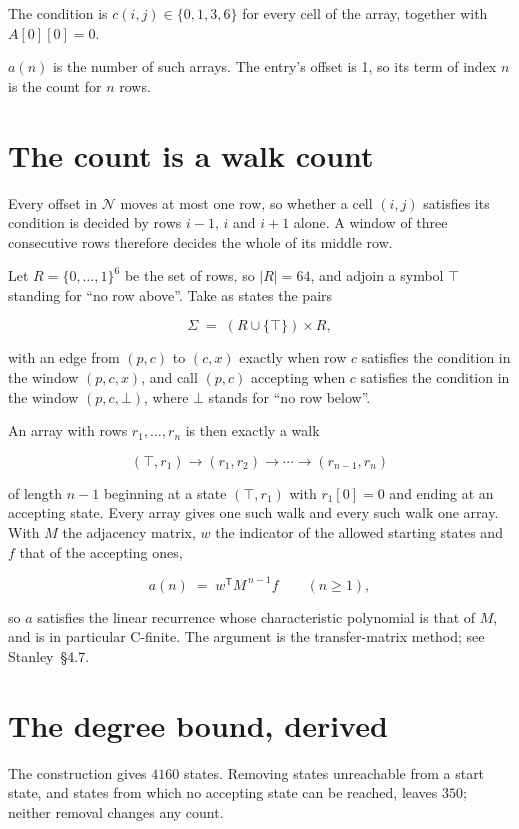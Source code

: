\documentclass[11pt]{article}
\theoremstyle{definition}
\begin{document}
The condition is $c(i,j) \in \{0, 1, 3, 6\}$ for every cell of the array, together with $A[0][0]=0$.

$a(n)$ is the number of such arrays. The entry's offset is 1, so its term of index $n$ is the count for $n$ rows.

\section{The count is a walk count}

Every offset in $\mathcal{N}$ moves at most one row, so whether a cell $(i,j)$ satisfies its condition is decided by rows $i-1$, $i$ and $i+1$ alone. A window of three consecutive rows therefore decides the whole of its middle row.

Let $R = \{0,\dots,1\}^{6}$ be the set of rows, so $|R| = 64$, and adjoin a symbol $\top$ standing for ``no row above''. Take as states the pairs

\[\Sigma \;=\; (R \cup \{\top\}) \times R,\]

with an edge from $(p,c)$ to $(c,x)$ exactly when row $c$ satisfies the condition in the window $(p,c,x)$, and call $(p,c)$ accepting when $c$ satisfies the condition in the window $(p,c,\bot)$, where $\bot$ stands for ``no row below''.

An array with rows $r_1,\dots,r_n$ is then exactly a walk

\[(\top,r_1) \to (r_1,r_2) \to \cdots \to (r_{n-1},r_n)\]

of length $n-1$ beginning at a state $(\top,r_1)$ with $r_1[0]=0$ and ending at an accepting state. Every array gives one such walk and every such walk one array. With $M$ the adjacency matrix, $w$ the indicator of the allowed starting states and $f$ that of the accepting ones,

\[a(n) \;=\; w^{\mathsf T} M^{\,n-1} f \qquad (n \ge 1),\]

so $a$ satisfies the linear recurrence whose characteristic polynomial is that of $M$, and is in particular C-finite. The argument is the transfer-matrix method; see Stanley~\S4.7.

\section{The degree bound, derived}

The construction gives $4160$ states. Removing states unreachable from a start state, and states from which no accepting state can be reached, leaves $350$; neither removal changes any count.
\end{document}
